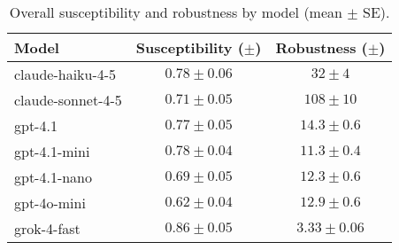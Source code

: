 \begin{table}[t]
  \centering
  \caption{Overall susceptibility and robustness by model (mean $\pm$ SE).}
  \label{tab:summary_by_model}
  \begin{tabular}{lcc}
    \toprule
    Model & Susceptibility ($\pm$) & Robustness ($\pm$) \\
    \midrule
    claude-haiku-4-5 & $0.78\pm 0.06$ & $32\pm 4$ \\
    claude-sonnet-4-5 & $0.71\pm 0.05$ & $108\pm 10$ \\
    gpt-4.1 & $0.77\pm 0.05$ & $14.3\pm 0.6$ \\
    gpt-4.1-mini & $0.78\pm 0.04$ & $11.3\pm 0.4$ \\
    gpt-4.1-nano & $0.69\pm 0.05$ & $12.3\pm 0.6$ \\
    gpt-4o-mini & $0.62\pm 0.04$ & $12.9\pm 0.6$ \\
    grok-4-fast & $0.86\pm 0.05$ & $3.33\pm 0.06$ \\
    \bottomrule
  \end{tabular}
\end{table}
